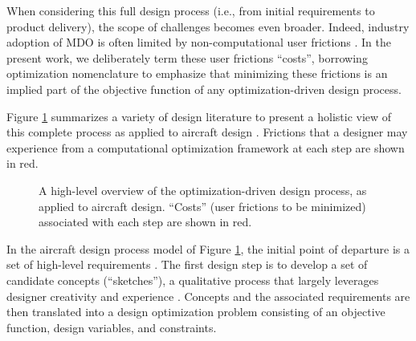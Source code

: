 \documentclass[12pt,vi,oneside]{report}
\begin{document}
    When considering this full design process (i.e., from initial requirements to product delivery), the scope of challenges becomes even broader. Indeed, industry adoption of MDO is often limited by non-computational user frictions \cite{salas_framework_1998, gpkit, martins_engineering_2021}. In the present work, we deliberately term these user frictions ``costs'', borrowing optimization nomenclature to emphasize that minimizing these frictions is an implied part of the objective function of any optimization-driven design process.

    Figure \ref{fig:birds_eye_view} summarizes a variety of design literature to present a holistic view of this complete process as applied to aircraft design \cite{torenbeek_advanced_2013, martins_engineering_2021, yang_observations_2009, torenbeek_synthesis_1976, roskam_airplane_1989, nicolai_fundamentals_2010, salas_framework_1998}. Frictions that a designer may experience from a computational optimization framework at each step are shown in \textcolor[HTML]{BB5045}{red}.

    \begin{figure}[h]
        \centering
        \caption{A high-level overview of the optimization-driven design process, as applied to aircraft design. ``Costs'' (user frictions to be minimized) associated with each step are shown in \textcolor[HTML]{BB5045}{red}.}
        \label{fig:birds_eye_view}
    \end{figure}

    In the aircraft design process model of Figure \ref{fig:birds_eye_view}, the initial point of departure is a set of high-level requirements \cite{torenbeek_synthesis_1976, torenbeek_advanced_2013}. The first design step is to develop a set of candidate concepts (``sketches''), a qualitative process that largely leverages designer creativity and experience \cite{yang_observations_2009, roskam_airplane_1989}. Concepts and the associated requirements are then translated into a design optimization problem consisting of an objective function, design variables, and constraints. %
\end{document}
